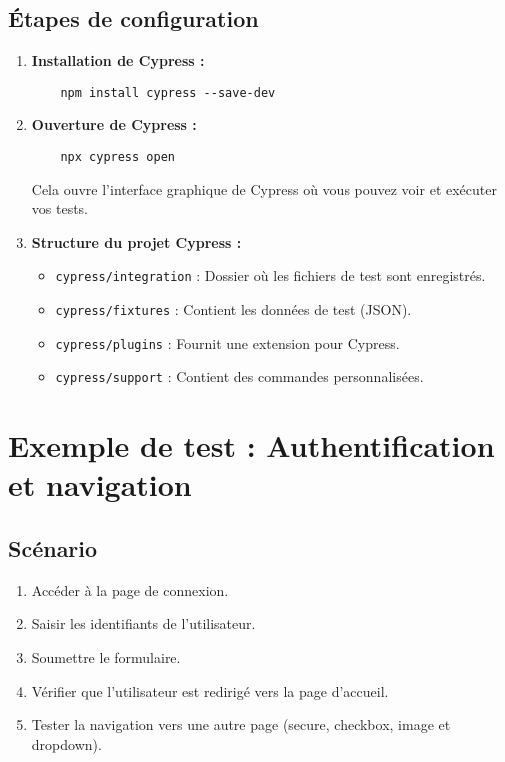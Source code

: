 \documentclass[a4paper,12pt]{article}
\begin{document}
\subsection*{Étapes de configuration}
\begin{enumerate}
    \item \textbf{Installation de Cypress :}
    \begin{lstlisting}
    npm install cypress --save-dev
    \end{lstlisting}
    
    \item \textbf{Ouverture de Cypress :}
    \begin{lstlisting}
    npx cypress open
    \end{lstlisting}
    Cela ouvre l'interface graphique de Cypress où vous pouvez voir et exécuter vos tests.

    \item \textbf{Structure du projet Cypress :}
    \begin{itemize}
        \item \texttt{cypress/integration} : Dossier où les fichiers de test sont enregistrés.
        \item \texttt{cypress/fixtures} : Contient les données de test (JSON).
        \item \texttt{cypress/plugins} : Fournit une extension pour Cypress.
        \item \texttt{cypress/support} : Contient des commandes personnalisées.
    \end{itemize}
\end{enumerate}

\section*{Exemple de test : Authentification et navigation}

\subsection*{Scénario}
\begin{enumerate}
    \item Accéder à la page de connexion.
    \item Saisir les identifiants de l'utilisateur.
    \item Soumettre le formulaire.
    \item Vérifier que l'utilisateur est redirigé vers la page d'accueil.
    \item Tester la navigation vers une autre page (secure, checkbox, image et dropdown).
\end{enumerate}
\end{document}
